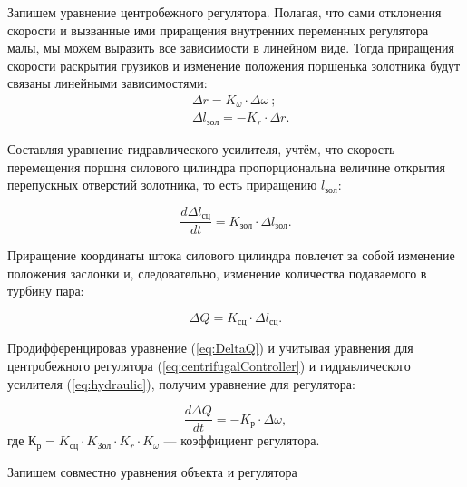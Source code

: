 Запишем уравнение центробежного регулятора. Полагая, что сами отклонения скорости и вызванные ими приращения внутренних переменных регулятора малы, мы можем выразить все зависимости в линейном виде. Тогда приращения скорости раскрытия грузиков и изменение положения поршенька золотника будут связаны линейными зависимостями: 
\begin{align}\label{eq:centrifugalController}
	&\Delta r=K_{\omega}\cdot\Delta\omega~;\\\nonumber
	&\Delta l_{зол}=-K_{r}\cdot\Delta r.
\end{align}

Составляя уравнение гидравлического усилителя, учтём, что скорость перемещения поршня силового цилиндра пропорциональна величине открытия перепускных отверстий золотника, то есть приращению $ l_{зол} $:

\begin{equation}\label{eq:hydraulic}
	\frac{d\Delta l_{сц}}{dt}=K_{зол}\cdot\Delta l_{зол}.
\end{equation}

Приращение координаты штока силового цилиндра повлечет за собой изменение положения заслонки и, следовательно, изменение количества подаваемого в турбину пара:	

\begin{equation}\label{eq:DeltaQ}
	\Delta Q=K_{сц}\cdot\Delta l_{сц}.
\end{equation}

Продифференцировав уравнение (\ref{eq:DeltaQ}) и учитывая уравнения для центробежного регулятора (\ref{eq:centrifugalController}) и гидравлического усилителя (\ref{eq:hydraulic}), получим уравнение для регулятора:

\begin{equation}
	\frac{d\Delta Q}{dt}=-K_{р}\cdot\Delta\omega,
\end{equation}
где $ К_{р}=K_{сц}\cdot K_{Зол}\cdot K_{r}\cdot K_{\omega} $ --- коэффициент регулятора.

Запишем совместно уравнения объекта и регулятора

